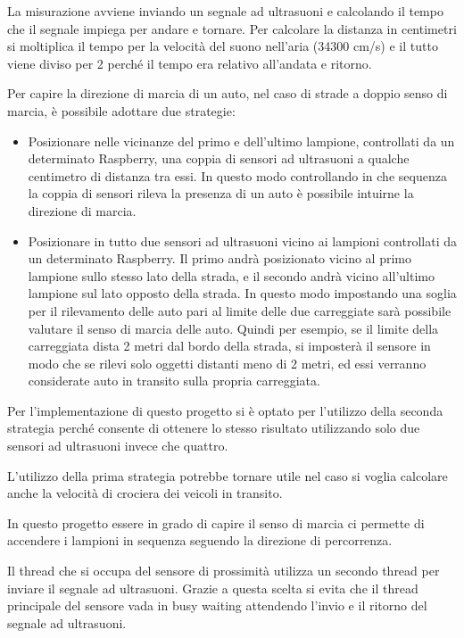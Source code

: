 La misurazione avviene inviando un segnale ad ultrasuoni e calcolando il tempo che il segnale impiega per andare e tornare.
Per calcolare la distanza in centimetri si moltiplica il tempo per la velocità del suono nell'aria (34300 cm/s) e il tutto viene diviso per 2 perché il tempo era relativo all'andata e ritorno.

Per capire la direzione di marcia di un auto, nel caso di strade a doppio senso di marcia, è possibile adottare due strategie:
\begin{itemize}
	\item Posizionare nelle vicinanze del primo e dell'ultimo lampione, controllati da un determinato Raspberry, una coppia di sensori ad ultrasuoni a qualche centimetro di distanza tra essi.
	In questo modo controllando in che sequenza la coppia di sensori rileva la presenza di un auto è possibile intuirne la direzione di marcia.
	\item Posizionare in tutto due sensori ad ultrasuoni vicino ai lampioni controllati da un determinato Raspberry.
	Il primo andrà posizionato vicino al primo lampione sullo stesso lato della strada, e il secondo andrà vicino all'ultimo lampione sul lato opposto della strada.
	In questo modo impostando una soglia per il rilevamento delle auto pari al limite delle due carreggiate sarà possibile valutare il senso di marcia delle auto.
	Quindi per esempio, se il limite della carreggiata dista 2 metri dal bordo della strada, si imposterà il sensore in modo che se rilevi solo oggetti distanti meno di 2 metri, ed essi verranno considerate auto in transito sulla propria carreggiata.
\end{itemize}

Per l'implementazione di questo progetto si è optato per l'utilizzo della seconda strategia perché consente di ottenere lo stesso risultato utilizzando solo due sensori ad ultrasuoni invece che quattro.

L'utilizzo della prima strategia potrebbe tornare utile nel caso si voglia calcolare anche la velocità di crociera dei veicoli in transito.

In questo progetto essere in grado di capire il senso di marcia ci permette di accendere i lampioni in sequenza seguendo la direzione di percorrenza.

Il thread che si occupa del sensore di prossimità utilizza un secondo thread per inviare il segnale ad ultrasuoni.
Grazie a questa scelta si evita che il thread principale del sensore vada in busy waiting attendendo l'invio e il ritorno del segnale ad ultrasuoni.

